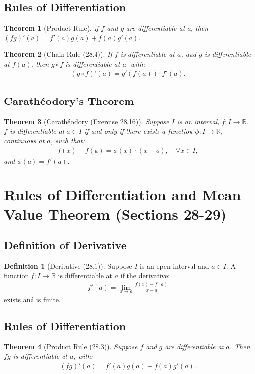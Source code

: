 \documentclass[9pt]{article}
\theoremstyle{definition}
\newtheorem{definition}{Definition}
\theoremstyle{plain}
\newtheorem{theorem}{Theorem}
\begin{document}
\subsection*{Rules of Differentiation}
\begin{theorem}[Product Rule]
If $ f $ and $ g $ are differentiable at $ a $, then $ (fg)'(a) = f'(a)g(a) + f(a)g'(a) $.
\end{theorem}

\begin{theorem}[Chain Rule (28.4)]
If $ f $ is differentiable at $ a $, and $ g $ is differentiable at $ f(a) $, then $ g \circ f $ is differentiable at $ a $, with:
\begin{align}
(g \circ f)'(a) = g'(f(a)) \cdot f'(a).
\end{align}
\end{theorem}

\subsection*{Carathéodory’s Theorem}
\begin{theorem}[Carathéodory (Exercise 28.16)]
Suppose $ I $ is an interval, $ f : I \to \mathbb{R} $. $ f $ is differentiable at $ a \in I $ if and only if there exists a function $ \phi : I \to \mathbb{R} $, continuous at $ a $, such that:
\begin{align}
f(x) - f(a) = \phi(x) \cdot (x - a), \quad \forall x \in I,
\end{align}
and $ \phi(a) = f'(a) $.
\end{theorem}
\section*{Rules of Differentiation and Mean Value Theorem (Sections 28-29)}

\subsection*{Definition of Derivative}
\begin{definition}[Derivative (28.1)]
Suppose $ I $ is an open interval and $ a \in I $. A function $ f : I \to \mathbb{R} $ is differentiable at $ a $ if the derivative:
\begin{align}
f'(a) = \lim_{x \to a} \frac{f(x) - f(a)}{x - a}
\end{align}
exists and is finite.
\end{definition}

\subsection*{Rules of Differentiation}
\begin{theorem}[Product Rule (28.3)]
Suppose $ f $ and $ g $ are differentiable at $ a $. Then $ fg $ is differentiable at $ a $, with:
\begin{align}
(fg)'(a) = f'(a)g(a) + f(a)g'(a).
\end{align}
\end{theorem}
\end{document}
